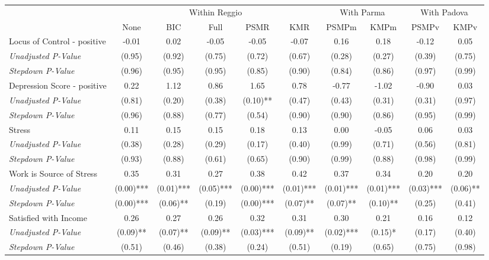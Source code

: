 \begin{tabular}{l c c c c c c c c c}
\toprule
& \multicolumn{5}{c}{Within Reggio} & \multicolumn{2}{c}{With Parma} & \multicolumn{2}{c}{With Padova} \\\cmidrule(lr){2-6} \cmidrule(lr){7-8} \cmidrule(lr){9-10}
 & None & BIC & Full & PSMR & KMR & PSMPm & KMPm & PSMPv & KMPv \\
\midrule
Locus of Control - positive & -0.01 & 0.02 & -0.05 & -0.05 & -0.07 & 0.16 & 0.18 & -0.12 & 0.05 \\
\quad \textit{Unadjusted P-Value} & (0.95) & (0.92) & (0.75) & (0.72) & (0.67) & (0.28) & (0.27) & (0.39) & (0.75) \\
\quad \textit{Stepdown P-Value} & (0.96) & (0.95) & (0.95) & (0.85) & (0.90) & (0.84) & (0.86) & (0.97) & (0.99) \\
Depression Score - positive & 0.22 & 1.12 & 0.86 & 1.65 & 0.78 & -0.77 & -1.02 & -0.90 & 0.03 \\
\quad \textit{Unadjusted P-Value} & (0.81) & (0.20) & (0.38) & (0.10)** & (0.47) & (0.43) & (0.31) & (0.31) & (0.97) \\
\quad \textit{Stepdown P-Value} & (0.96) & (0.88) & (0.77) & (0.54) & (0.90) & (0.90) & (0.86) & (0.95) & (0.99) \\
Stress & 0.11 & 0.15 & 0.15 & 0.18 & 0.13 & 0.00 & -0.05 & 0.06 & 0.03 \\
\quad \textit{Unadjusted P-Value} & (0.38) & (0.28) & (0.29) & (0.17) & (0.40) & (0.99) & (0.71) & (0.56) & (0.81) \\
\quad \textit{Stepdown P-Value} & (0.93) & (0.88) & (0.61) & (0.65) & (0.90) & (0.99) & (0.88) & (0.98) & (0.99) \\
Work is Source of Stress & 0.35 & 0.31 & 0.27 & 0.38 & 0.42 & 0.37 & 0.34 & 0.20 & 0.20 \\
\quad \textit{Unadjusted P-Value} & (0.00)*** & (0.01)*** & (0.05)*** & (0.00)*** & (0.01)*** & (0.01)*** & (0.01)*** & (0.03)*** & (0.06)** \\
\quad \textit{Stepdown P-Value} & (0.00)*** & (0.06)** & (0.19) & (0.00)*** & (0.07)** & (0.07)** & (0.10)** & (0.25) & (0.41) \\
Satisfied with Income & 0.26 & 0.27 & 0.26 & 0.32 & 0.31 & 0.30 & 0.21 & 0.16 & 0.12 \\
\quad \textit{Unadjusted P-Value} & (0.09)** & (0.07)** & (0.09)** & (0.03)*** & (0.09)** & (0.02)*** & (0.15)* & (0.17) & (0.40) \\
\quad \textit{Stepdown P-Value} & (0.51) & (0.46) & (0.38) & (0.24) & (0.51) & (0.19) & (0.65) & (0.75) & (0.98) \\

\end{tabular}
